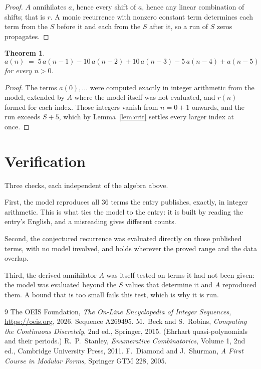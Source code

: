 \documentclass[11pt,a4paper]{article}
\theoremstyle{plain}
\newtheorem{theorem}{Theorem}
\theoremstyle{definition}
\begin{document}
\begin{proof}
$A$ annihilates $a$, hence every shift of $a$, hence any linear combination of shifts; that is
$r$. A monic recurrence with nonzero constant term determines each term from the $S$ before it
and each from the $S$ after it, so a run of $S$ zeros propagates.
\end{proof}

\begin{theorem}
\[
a(n)\;=\;5\,a(n-1) - 10\,a(n-2) + 10\,a(n-3) - 5\,a(n-4) + a(n-5)
\]
for every $n>0$.
\end{theorem}

\begin{proof}
The terms $a(0),\dots$ were computed exactly in integer arithmetic from the model, extended by
$A$ where the model itself was not evaluated, and $r(n)$ formed for each index. Those integers
vanish from $n=0+1$ onwards, and the run exceeds $S+5$, which by
Lemma~\ref{lem:crit} settles every larger index at once.
\end{proof}

\section{Verification}

Three checks, each independent of the algebra above.

First, the model reproduces all $36$ terms the entry publishes, exactly, in integer
arithmetic. This is what ties the model to the entry: it is built by reading the entry's
English, and a misreading gives different counts.

Second, the conjectured recurrence was evaluated directly on those published terms, with no
model involved, and holds wherever the proved range and the data overlap.

Third, the derived annihilator $A$ was itself tested on terms it had not been given: the model
was evaluated beyond the $S$ values that determine it and $A$ reproduced them. A bound that is
too small fails this test, which is why it is run.

\begin{thebibliography}{9}
 The OEIS Foundation, \emph{The On-Line Encyclopedia of Integer
Sequences}, \url{https://oeis.org}, 2026. Sequence A269495.
 M.~Beck and S.~Robins, \emph{Computing the Continuous Discretely},
2nd ed., Springer, 2015. (Ehrhart quasi-polynomials and their periods.)
 R.~P.~Stanley, \emph{Enumerative Combinatorics}, Volume 1, 2nd ed.,
Cambridge University Press, 2011.
 F.~Diamond and J.~Shurman, \emph{A First Course in Modular Forms},
Springer GTM 228, 2005.
\end{thebibliography}
\end{document}
